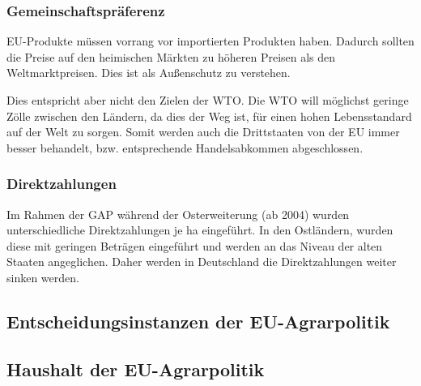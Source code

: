 \documentclass[11pt]{scrartcl}
\begin{document}
\subsubsection{Gemeinschaftspräferenz}
\ac{EU}-Produkte müssen vorrang vor importierten Produkten haben.
Dadurch sollten die Preise auf den heimischen Märkten zu höheren Preisen als den Weltmarktpreisen.
Dies ist als Außenschutz zu verstehen.

Dies entspricht aber nicht den Zielen der \ac{WTO}.
Die \ac{WTO} will möglichst geringe Zölle zwischen den Ländern, da dies der Weg ist, für einen hohen Lebensstandard auf der Welt zu sorgen.
Somit werden auch die Drittstaaten von der \ac{EU} immer besser behandelt, bzw. entsprechende Handelsabkommen abgeschlossen.

\subsubsection{Direktzahlungen}
Im Rahmen der \ac{GAP} während der Osterweiterung (ab 2004) wurden unterschiedliche Direktzahlungen je ha eingeführt.
In den Ostländern, wurden diese mit geringen Beträgen eingeführt und werden an das Niveau der alten Staaten angeglichen.
Daher werden in Deutschland die Direktzahlungen weiter sinken werden.




\subsection{Entscheidungsinstanzen der \ac{EU}-Agrarpolitik}

\subsection{Haushalt der \ac{EU}-Agrarpolitik}

\end{document}
